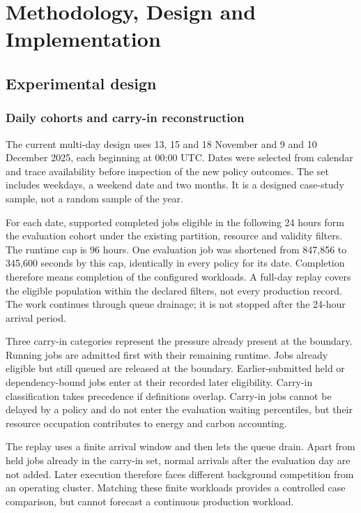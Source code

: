 \chapter{Methodology, Design and Implementation}\label{ch:method}\label{ch:implementation}
\section{Experimental design}
\subsection{Daily cohorts and carry-in reconstruction}\label{sec:cohort-reconstruction}
The current multi-day design uses 13, 15 and 18 November and 9 and 10 December 2025, each beginning at 00:00 UTC. Dates were selected from calendar and trace availability before inspection of the new policy outcomes. The set includes weekdays, a weekend date and two months. It is a designed case-study sample, not a random sample of the year.

For each date, supported completed jobs eligible in the following 24 hours form the evaluation cohort under the existing partition, resource and validity filters. The runtime cap is 96 hours. One evaluation job was shortened from 847,856 to 345,600 seconds by this cap, identically in every policy for its date. Completion therefore means completion of the configured workloads. A full-day replay covers the eligible population within the declared filters, not every production record. The work continues through queue drainage; it is not stopped after the 24-hour arrival period.

Three carry-in categories represent the pressure already present at the boundary. Running jobs are admitted first with their remaining runtime. Jobs already eligible but still queued are released at the boundary. Earlier-submitted held or dependency-bound jobs enter at their recorded later eligibility. Carry-in classification takes precedence if definitions overlap. Carry-in jobs cannot be delayed by a policy and do not enter the evaluation waiting percentiles, but their resource occupation contributes to energy and carbon accounting.

The replay uses a finite arrival window and then lets the queue drain. Apart from held jobs already in the carry-in set, normal arrivals after the evaluation day are not added. Later execution therefore faces different background competition from an operating cluster. Matching these finite workloads provides a controlled case comparison, but cannot forecast a continuous production workload.

